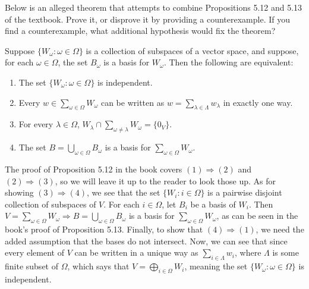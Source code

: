 \begin{problem}
Below is an alleged theorem that attempts to combine Propositions 5.12 and 5.13
of the textbook.  Prove it, or disprove it by providing a counterexample.  If
you find a counterexample, what additional hypothesis would fix the theorem?
\begin{prop}
Suppose $\{W_\omega : \omega \in \Omega\}$ is a collection of subspaces of a vector
space, and suppose, for each $\omega \in \Omega$, the set $B_\omega$ is a
basis for $W_\omega$.  Then the following are equivalent: \\[-0.5em]
\begin{enumerate}
\item The set $\{W_\omega : \omega \in \Omega\}$ is independent.\\[-0.5em]
\item Every $w \in \sum_{\omega \in \Omega}W_\omega$ can be written as 
$w  = \sum_{\lambda \in \Lambda}w_\lambda$ in exactly one way.\\[-0.5em]
\item For every $\lambda \in \Omega$, 
$W_\lambda \cap \sum_{\omega \neq\lambda}W_\omega = \{0_V\}$.\\[-0.5em]
\item The set $B = \bigcup_{\omega \in \Omega} B_\omega$ is a basis for 
$\sum_{\omega \in \Omega}W_\omega$.
\end{enumerate}
\end{prop}
\smallskip

The proof of Proposition 5.12 in the book covers $(1) \Rightarrow (2)$ and $(2) \Rightarrow (3)$, so we will leave it up to the reader to look those up. As for showing $(3) \Rightarrow (4)$, we see that the set $\{W_i : i \in \Omega\}$ is a pairwise disjoint collection of subspaces of $V$. For each $i \in \Omega$, let $B_i$ be a basis of $W_i$. Then $V=\sum_{\omega \in \Omega}W_\omega \Rightarrow B = \bigcup_{\omega \in \Omega} B_\omega$ is a basis for $\sum_{\omega \in \Omega}W_\omega$, as can be seen in the book's proof of Proposition 5.13. Finally, to show that $(4) \Rightarrow (1)$, we need the added assumption that the bases do not intersect. Now, we can see that since every element of $V$ can be written in a unique way as $\sum_{i \in \Lambda}w_i$, where $\Lambda$ is some finite subset of $\Omega$, which says that $V=\bigoplus_{i \in \Omega} W_i$, meaning the set $\{W_\omega : \omega \in \Omega\}$ is independent.
\end{problem}

